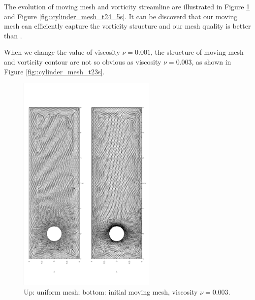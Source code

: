 \documentclass[a4paper, 11pt]{article}
\begin{document}
      The evolution of moving mesh and vorticity streamline  
      are illustrated in Figure \ref{fig::cylinder_initial_mesh} and
      Figure \ref{fig::cylinder_mesh_t24_5s}. It
      can be discoverd that our moving mesh can efficiently capture the
      vorticity structure and our mesh quality is better than \cite{cao1999anr}.
      
      When we change the value of viscosity $\nu = 0.001$, the
      structure of moving mesh and vorticity contour are not so
      obvious as viscosity $\nu = 0.003$, as shown in 
      Figure \ref{fig::cylinder_mesh_t23s}. 
      
      \begin{figure}[!htbp]
        \centering
        \includegraphics[width = 0.6\textwidth, angle = -90]{picture/obstacle_flow_data/initial_mesh.eps}
        \caption{\small Up: uniform mesh; bottom: initial
          moving mesh, viscosity $\nu = 0.003$.}
        \label{fig::cylinder_initial_mesh}
      \end{figure}

\end{document}
